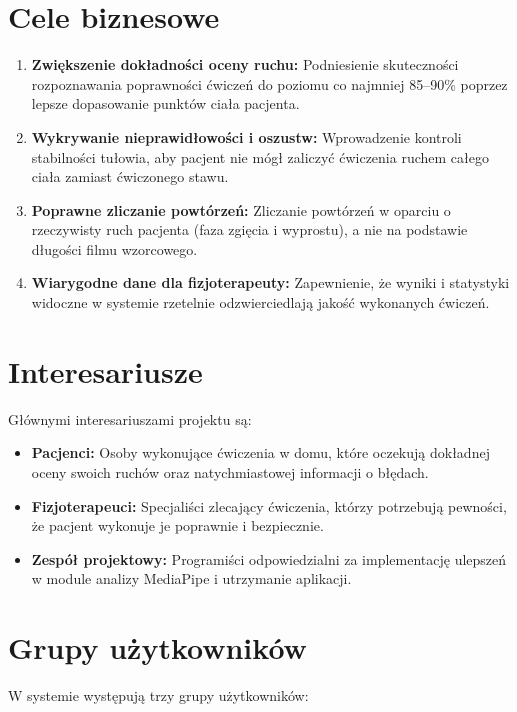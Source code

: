 \documentclass[11pt,a4paper]{article}
\begin{document}
\section{Cele biznesowe}

\begin{enumerate}
    \item \textbf{Zwiększenie dokładności oceny ruchu:} Podniesienie skuteczności rozpoznawania poprawności ćwiczeń do poziomu co najmniej 85--90\% poprzez lepsze dopasowanie punktów ciała pacjenta.
    \item \textbf{Wykrywanie nieprawidłowości i oszustw:} Wprowadzenie kontroli stabilności tułowia, aby pacjent nie mógł zaliczyć ćwiczenia ruchem całego ciała zamiast ćwiczonego stawu.
    \item \textbf{Poprawne zliczanie powtórzeń:} Zliczanie powtórzeń w oparciu o rzeczywisty ruch pacjenta (faza zgięcia i wyprostu), a nie na podstawie długości filmu wzorcowego.
    \item \textbf{Wiarygodne dane dla fizjoterapeuty:} Zapewnienie, że wyniki i statystyki widoczne w systemie rzetelnie odzwierciedlają jakość wykonanych ćwiczeń.
\end{enumerate}

\section{Interesariusze}
Głównymi interesariuszami projektu są:

\begin{itemize}
    \item \textbf{Pacjenci:} Osoby wykonujące ćwiczenia w domu, które oczekują dokładnej oceny swoich ruchów oraz natychmiastowej informacji o błędach.
    \item \textbf{Fizjoterapeuci:} Specjaliści zlecający ćwiczenia, którzy potrzebują pewności, że pacjent wykonuje je poprawnie i bezpiecznie.
    \item \textbf{Zespół projektowy:} Programiści odpowiedzialni za implementację ulepszeń w module analizy MediaPipe i utrzymanie aplikacji.
\end{itemize}

\section{Grupy użytkowników}
W systemie występują trzy grupy użytkowników:
\end{document}
